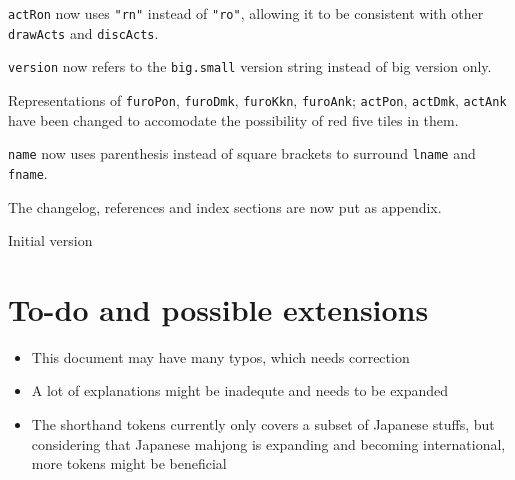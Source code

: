 \documentclass[%
	a4paper%
	,10pt%
	,twoside%
	,notitlepage%
]{article}%
\renewcommand*{\DTMdisplaydate}[4]{%
		\ifnum##4>-1{\DTMenglishshortweekdayname{##4}\space}\fi%
		\DTMtwodigits{##3}\space%
		\DTMenglishshortmonthname{##2}\space%
		##1%
	}%
\newcommand*{\github}[1]{\texorpdfstring{\href{https://github.com/#1}{\texttt{#1}}}{#1}}%
\begin{document}
\begin{changelog}[%
	section=true%
	,sectioncmd={\section}%
	,title={Changelog}%
	,label={sec:changelog}%
]
\begin{version}[%
		version=1.0.0-β%
		,author={\github{ChemistMikeLam}}%
		,date=Unreleased%
	]
		\changed{}%
			\item{}\lstinline/actRon/ now uses \lstinline/"rn"/ instead of \lstinline/"ro"/, allowing it to be consistent with other \lstinline/drawActs/ and \lstinline/discActs/. %
			\item{}\lstinline/version/ now refers to the \texttt{big.small} version string instead of big version only. %
			\item{}Representations of \lstinline/furoPon/, \lstinline/furoDmk/, \lstinline/furoKkn/, \lstinline/furoAnk/; \lstinline/actPon/, \lstinline/actDmk/, \lstinline/actAnk/ have been changed to accomodate the possibility of red five tiles in them. %
			\item{}\lstinline/name/ now uses parenthesis instead of square brackets to surround \lstinline/lname/ and \lstinline/fname/. %
			\item{}The changelog, references and index sections are now put as appendix. %
	\end{version}%
	\begin{version}[%
		version=0.0.0%
		,author={\github{ChemistMikeLam}}%
		,date={\DTMdisplaydate{2020}{06}{23}{1}}%
		,simple=true%
	]%
		\item{}Initial version%
	\end{version}%
\end{changelog}%
% 
\section{To-do and possible extensions}%
% 
	\begin{itemize}%
		\item{}This document may have many typos, which needs correction%
		\item{}A lot of explanations might be inadequte and needs to be expanded%
		\item{}The shorthand tokens currently only covers a subset of Japanese stuffs, but considering that Japanese mahjong is expanding and becoming international, more tokens might be beneficial%
	\end{itemize}%
% 
% 
% 
\printindex{}%
% 
\end{document}
